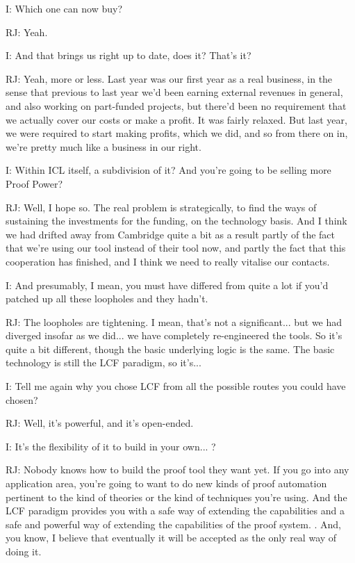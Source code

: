 \documentclass[10pt,titlepage]{book}
\begin{document}
I: Which one can now buy?

RJ: Yeah.

I: And that brings us right up to date, does it? That's it?

RJ: Yeah, more or less. Last year was our first year as a real business, in the sense that  previous to last year we'd been earning external revenues in general, and also working on part-funded projects, but there'd been no requirement that we actually cover our costs or make a profit. It was fairly relaxed. But last year, we were required to start making profits, which we did, and so from there on in, we're pretty much like a business in our right.

I: Within ICL itself, a subdivision of it? And you're going to be selling more Proof Power?

RJ: Well, I hope so. The real problem is strategically, to find the ways of sustaining the investments for the funding, on the technology basis. And I think we had drifted away from Cambridge quite a bit as a result partly of the fact that we're using our tool instead of their tool now, and partly the fact that this cooperation has finished, and I think we need to really vitalise our contacts.

I: And presumably, I mean, you must have differed from quite a lot if you'd patched up all these loopholes and they hadn't.

RJ: The loopholes are tightening. I mean, that's not a significant... but we had diverged insofar as we did... we have completely re-engineered the tools. So it's quite a bit different, though the basic underlying logic is the same. The basic technology is still the LCF paradigm, so it's...

I: Tell me again why you chose LCF from all the possible routes you could have chosen?

RJ: Well, it's powerful, and it's open-ended.

I: It's the flexibility of it to build in your own... ?

RJ: Nobody knows how to build the proof tool they want yet. If you go into any application area, you're going to want to do new kinds of proof automation pertinent to the kind of theories or the kind of techniques you're using. And the LCF paradigm provides you with a safe way of extending the capabilities and a safe and powerful way of extending the capabilities of the proof system. 		. And, you know, I believe that eventually it will be accepted as the only real way of doing it.
\end{document}
